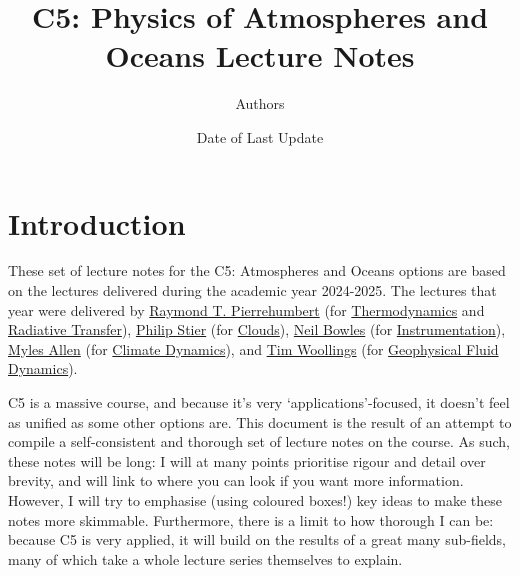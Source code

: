 \documentclass[a4paper,11pt]{report}
\title{C5: Physics of Atmospheres and Oceans Lecture Notes}
\author{Authors}
\date{Date of Last Update}
\begin{document}
\begin{titlingpage}
\maketitle
\end{titlingpage}

\tableofcontents

\newpage

\begin{sloppypar}

\section*{Introduction}

These set of lecture notes for the C5: Atmospheres and Oceans options are based on the lectures delivered during the academic year 2024-2025. The lectures that year were delivered by 
\href{https://users.physics.ox.ac.uk/~pierrehumbert/}{Raymond T. Pierrehumbert} 
(for \hyperref[Thermodynamics]{Thermodynamics} and \hyperref[Radiative Transfer]{Radiative Transfer}), 
\href{https://www.physics.ox.ac.uk/our-people/stier}{Philip Stier} 
(for \hyperref[Clouds]{Clouds}), 
\href{https://www.physics.ox.ac.uk/our-people/bowles}{Neil Bowles} 
(for \hyperref[Instrumentation]{Instrumentation}), 
\href{https://www.physics.ox.ac.uk/our-people/allenm}{Myles Allen} 
(for \hyperlink{Climate Dynamics}{Climate Dynamics}), and \href{https://www.physics.ox.ac.uk/our-people/woollings}{Tim Woollings} 
(for \hyperref[Geophysical Fluid Dynamics]{Geophysical Fluid Dynamics}).

C5 is a massive course, and because it's very `applications'-focused, it doesn't feel as unified as some other options are. This document is the result of an attempt to compile a self-consistent and thorough set of lecture notes on the course. As such, these notes will be long: I will at many points prioritise rigour and detail over brevity, and will link to where you can look if you want more information. However, I will try to emphasise (using coloured boxes!) key ideas to make these notes more skimmable. Furthermore, there is a limit to how thorough I can be: because C5 is very applied, it will build on the results of a great many sub-fields, many of which take a whole lecture series themselves to explain.



\end{sloppypar}
\end{document}
